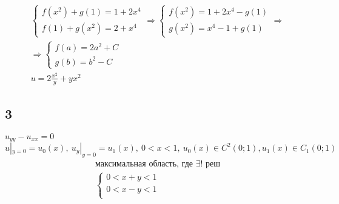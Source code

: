 \begin{gather*}
  \begin{cases}
  f(x^{2})+g(1)=1+2x^{4} \\ f(1)+g(x^{2})=2+x^{4}
  \end{cases} \Rightarrow \begin{cases}
    f(x^{2})=1+2x^{4}-g(1) \\ g(x^{2})=x^{4}-1+g(1)
  \end{cases} \Rightarrow \\
  \Rightarrow \begin{cases}
    f(a)=2a^{2}+C \\ g(b)=b^{2}-C
  \end{cases} \\
  \boxed{u= 2\frac{x^{2}}{y}+yx^{2}}
\end{gather*}
\subsection{3}
$u_{yy}-u_{xx}=0$ \\
$u|_{y=0}=u_{0}(x),\ u_{y}|_{y=0}=u_{1}(x), \ 0 < x < 1, \ u_{0}(x) \in C^{2}(0;1), u_{1}(x)
 \in C_{1}(0;1)$ \\ 
\begin{gather*}
  \text{максимальная область, где $\exists$! реш} \\ 
  \begin{cases}
   0 < x + y < 1 \\ 0< x-y<1 \\ 
  \end{cases}
\end{gather*}

